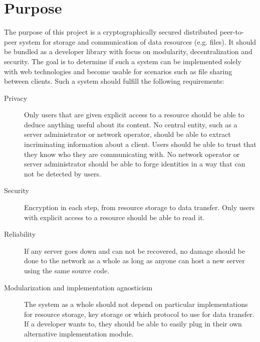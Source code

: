 \section{Purpose}\label{sec:purpose}

The purpose of this project is a cryptographically secured distributed peer-to-peer system for storage and communication of data resources (e.g. files). It should be bundled as a developer library with focus on modularity, decentralization and security. The goal is to determine if such a system can be implemented solely with web technologies and become usable for scenarios such as file sharing between clients.
Such a system should fulfill the following requirements:

\begin{description}
  \item[Privacy] Only users that are given explicit access to a resource should be able to deduce anything useful about its content. No central entity, such as a server administrator or network operator, should be able to extract incriminating information about a client. Users should be able to trust that they know who they are communicating with. No network operator or server administrator should be able to forge identities in a way that can not be detected by users.

\item[Security] Encryption in each step, from resource storage to data transfer. Only users with explicit access to a resource should be able to read it.

\item[Reliability] If any server goes down and can not be recovered, no damage should be done to the network as a whole as long as anyone can host a new server using the same source code.

\item[Modularization and implementation agnosticism] The system as a whole should not depend on particular implementations for resource storage, key storage or which protocol to use for data transfer. If a developer wants to, they should be able to easily plug in their own alternative implementation module.

\end{description}
